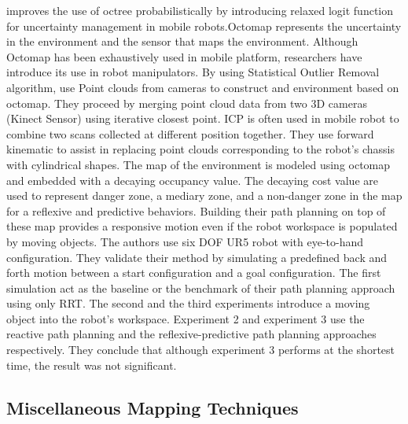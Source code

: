 \textcite{Hornung2013} improves the use of octree probabilistically by introducing relaxed
logit function for uncertainty management in mobile robots.Octomap represents the uncertainty
in the environment and the sensor that maps the environment. Although Octomap has been
exhaustively used in mobile platform, researchers have introduce its use in robot manipulators.
By using Statistical Outlier Removal algorithm, \textcite{Miseikis2017} use Point clouds from
cameras to construct and environment based on octomap. They proceed by merging point cloud
data from two 3D cameras (Kinect Sensor) using iterative closest point. \acrfull{ICP} is often used in mobile robot to combine two scans collected at different position together.
They use forward kinematic to assist in replacing point clouds corresponding to the robot’s
chassis with cylindrical shapes. The map of the environment is modeled using octomap and
embedded with a decaying occupancy value. The decaying cost value are used to represent
danger zone, a mediary zone, and a non-danger zone in the map for a reflexive and predictive
behaviors. Building their path planning on top of these map provides a responsive motion even
if the robot workspace is populated by moving objects. The authors use six \acrfull{DOF} UR5 robot with
eye-to-hand configuration. They validate their method by simulating a predefined back and forth
motion between a start configuration and a goal configuration. The first simulation act as the
baseline or the benchmark of their path planning approach using only RRT. The second and the third experiments introduce a moving object into the
robot's workspace. Experiment 2 and experiment 3 use the reactive path planning and the
reflexive-predictive path planning approaches respectively. They conclude that although
experiment 3 performs at the shortest time, the result was not significant.



\subsection{Miscellaneous Mapping Techniques}\label{sec:misc_map}

